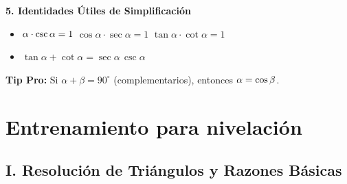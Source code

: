 \documentclass[letterpaper, 12pt]{article}
\let\sin\relax
\DeclareMathOperator{\sin}{sen}
\begin{document}
\begin{tcolorbox}[colback=celesteSuave, colframe=azulFuerte, title=\textbf{RESUMEN DE CLASES: LO QUE DEBES SABER}, fonttitle=\bfseries]
\vspace{0.1cm}
\textbf{5. Identidades Útiles de Simplificación}
\begin{itemize}[leftmargin=10pt, itemsep=0.15cm]
    \item $\sin\alpha \cdot \csc\alpha = 1$ \qquad $\cos\alpha \cdot \sec\alpha = 1$ \qquad $\tan\alpha \cdot \cot\alpha = 1$
    \item $\tan \alpha + \cot \alpha = \sec\alpha\,\csc\alpha$
\end{itemize}

\vspace{-0.1cm}
\begin{center}
    \small \textbf{Tip Pro:} Si $\alpha + \beta = 90^\circ$ (complementarios), entonces $\sin \alpha = \cos \beta$.
\end{center}
\end{tcolorbox}

\section*{Entrenamiento para nivelación}

\subsection*{I. Resolución de Triángulos y Razones Básicas}
\end{document}

